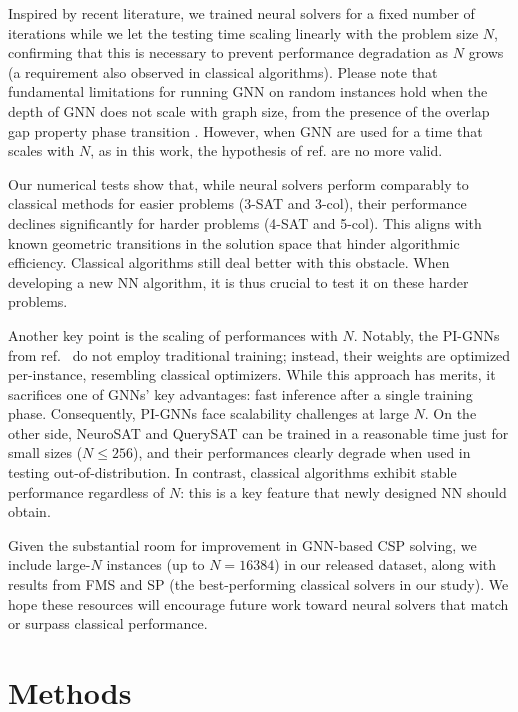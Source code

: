 \documentclass{article}
\begin{document}
Inspired by recent literature, we trained neural solvers for a fixed number of iterations while we let the testing time scaling linearly with the problem size $N$, confirming that this is necessary to prevent performance degradation as $N$ grows (a requirement also observed in classical algorithms). 
Please note that fundamental limitations for running GNN on random instances hold when the depth of GNN does not scale with graph size, from the presence of the overlap gap property phase transition \cite{gamarnik2023barriers}. However, when GNN are used for a time that scales with $N$, as in this work, the hypothesis of ref. \cite{gamarnik2023barriers} are no more valid.

Our numerical tests show that, while neural solvers perform comparably to classical methods for easier problems (3-SAT and 3-col), their performance declines significantly for harder problems (4-SAT and 5-col). This aligns with known geometric transitions in the solution space that hinder algorithmic efficiency. Classical algorithms still deal better with this obstacle. When developing a new NN algorithm, it is thus crucial to test it on these harder problems.

Another key point is the scaling of performances with $N$. Notably, the PI-GNNs from ref.~\cite{Schuetz_PIGNNcol_2022} do not employ traditional training; instead, their weights are optimized per-instance, resembling classical optimizers. While this approach has merits, it sacrifices one of GNNs’ key advantages: fast inference after a single training phase. Consequently, PI-GNNs face scalability challenges at large $N$. On the other side, NeuroSAT and QuerySAT can be trained in a reasonable time just for small sizes ($N\leq 256$), and their performances clearly degrade when used in testing out-of-distribution.
In contrast, classical algorithms exhibit stable performance regardless of $N$: this is a key feature that newly designed NN should obtain. 

Given the substantial room for improvement in GNN-based CSP solving, we include large-$N$ instances (up to $N = 16384$) in our released dataset, along with results from FMS and SP (the best-performing classical solvers in our study). We hope these resources will encourage future work toward neural solvers that match or surpass classical performance.


\section{Methods}
\label{sec:methods}
\end{document}
